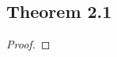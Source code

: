 \documentclass[../../main.tex]{subfiles}
\begin{document}
\subsection{Theorem 2.1}
\begin{wts}

\end{wts}
\begin{proof}

\end{proof}
\end{document}
